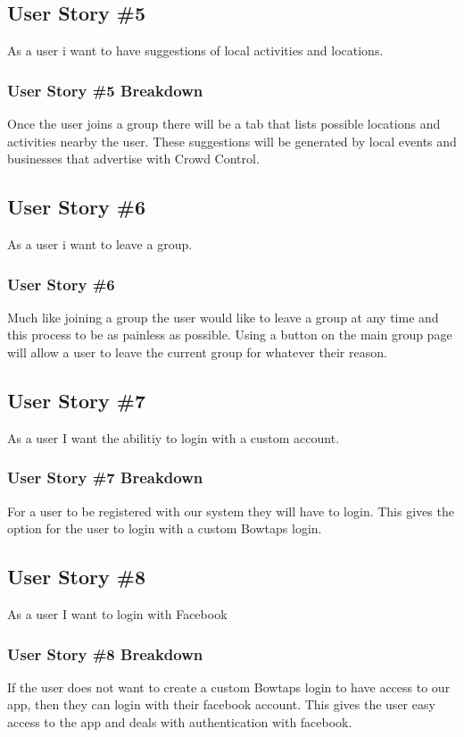 \subsection{User Story \#5} 
As a user i want to have suggestions of local activities and locations.

\subsubsection{User Story \#5 Breakdown}
Once the user joins a group there will be a tab that lists possible locations and activities nearby the user.  These suggestions will be generated by local events and businesses that advertise with Crowd Control.

\subsection{User Story \#6} 
As a user i want to leave a group.

\subsubsection{User Story \#6}
Much like joining a group the user would like to leave a group at any time and this process to be as painless as possible.  Using a button on the main group page will allow a user to leave the current group for whatever their reason.

\subsection{User Story \#7} 
As a user I want the abilitiy to login with a custom account.

\subsubsection{User Story \#7 Breakdown}
For a user to be registered with our system they will have to login.  This gives the option for the user to login with a custom Bowtaps login.

\subsection{User Story \#8}
As a user I want to login with Facebook

\subsubsection{User Story \#8 Breakdown}
If the user does not want to create a custom Bowtaps login to have access to our app,  then they can login with their facebook account.  This gives the user easy access to the app and deals with authentication with facebook.

